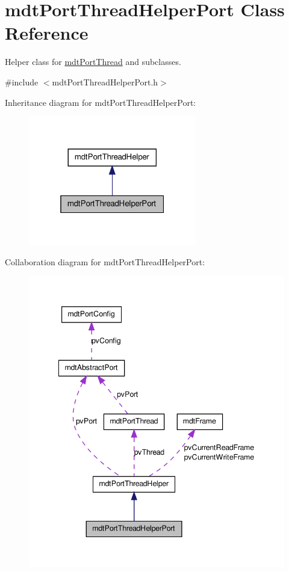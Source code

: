 \hypertarget{classmdt_port_thread_helper_port}{
\section{mdtPortThreadHelperPort Class Reference}
\label{classmdt_port_thread_helper_port}
}


Helper class for \hyperlink{classmdt_port_thread}{mdtPortThread} and subclasses.  




{\ttfamily \#include $<$mdtPortThreadHelperPort.h$>$}



Inheritance diagram for mdtPortThreadHelperPort:\nopagebreak
\begin{figure}[H]
\begin{center}
\leavevmode
\includegraphics[width=208pt]{classmdt_port_thread_helper_port__inherit__graph}
\end{center}
\end{figure}


Collaboration diagram for mdtPortThreadHelperPort:\nopagebreak
\begin{figure}[H]
\begin{center}
\leavevmode
\includegraphics[width=342pt]{classmdt_port_thread_helper_port__coll__graph}
\end{center}
\end{figure}

